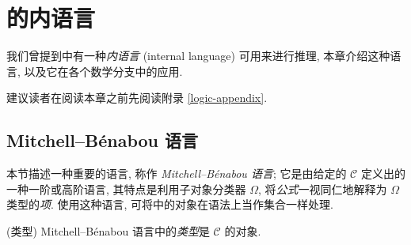 \chapter{\topos{}的内语言}


\minitoc

我们曾提到\topos{}中有一种\emph{内语言} (internal language) 可用来进行推理, 本章介绍这种语言, 以及它在各个数学分支中的应用.

\begin{remark}
	{}
	建议读者在阅读本章之前先阅读附录 \ref{logic-appendix}.
\end{remark}

\section{Mitchell--B\'enabou 语言}

\label{Mitchell--Benabou-language}

本节描述一种重要的语言, 称作 \emph{Mitchell--B\'enabou 语言}; 它是由给定的\topos{} $\mathcal C$ 定义出的一种一阶或高阶语言, 其特点是利用子对象分类器 $\Omega$, 将\emph{公式}一视同仁地解释为 $\Omega$ 类型的\emph{项}. 使用这种语言, 可将\topos{}中的对象在语法上当作集合一样处理.

\begin{definition}
    {(类型)}
    Mitchell--B\'enabou 语言中的\emph{类型}是 $\mathcal C$ 的对象.
\end{definition}




